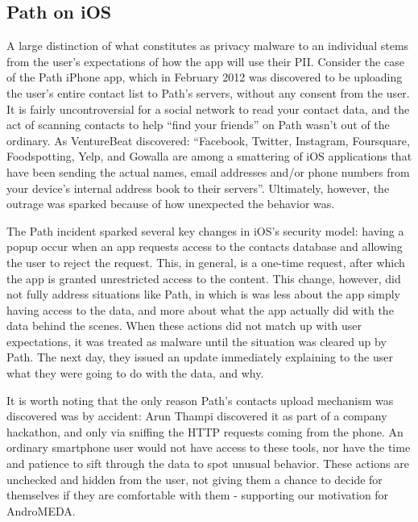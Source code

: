 \subsection{Path on iOS}
\label{sec:path}
A large distinction of what constitutes as privacy malware to an individual stems from the user's expectations of how the app will use their PII. Consider the case of the Path iPhone app, which in February 2012 was discovered to be uploading the user's entire contact list to Path's servers, without any consent from the user\citep{thampi2012}. It is fairly uncontroversial for a social network to read your contact data, and the act of scanning contacts to help ``find your friends'' on Path wasn't out of the ordinary. As VentureBeat discovered: ``Facebook, Twitter, Instagram, Foursquare, Foodspotting, Yelp, and Gowalla are among a smattering of iOS applications that have been sending the actual names, email addresses and/or phone numbers from your device's internal address book to their servers''\citep{vb2012addressbook}. Ultimately, however, the outrage was sparked because of how unexpected the behavior was.

The Path incident sparked several key changes in iOS's security model: having a popup occur when an app requests access to the contacts database and allowing the user to reject the request. This, in general, is a one-time request, after which the app is granted unrestricted access to the content\citep{AppleContacts}. This change, however, did not fully address situations like Path, in which is was less about the app simply having access to the data, and more about what the app actually did with the data behind the scenes. When these actions did not match up with user expectations, it was treated as malware until the situation was cleared up by Path. The next day, they issued an update immediately explaining to the user what they were going to do with the data, and why.

It is worth noting that the only reason Path's contacts upload mechanism was discovered was by accident: Arun Thampi discovered it as part of a company hackathon, and only via sniffing the HTTP requests coming from the phone. An ordinary smartphone user would not have access to these tools, nor have the time and patience to sift through the data to spot unusual behavior. These actions are unchecked and hidden from the user, not giving them a chance to decide for themselves if they are comfortable with them - supporting our motivation for AndroMEDA.

